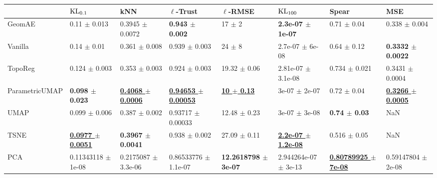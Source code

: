 \begin{tabular}{llllllll}
\toprule
{} &                               $\operatorname{KL}_{0.1}$ &                                        kNN &                                 $\ell$-Trust &                          $\ell$-RMSE &                                 $\operatorname{KL}_{100}$ &                                         Spear &                                        MSE \\
\midrule
GeomAE         &                           0.11 $\pm$ 0.013 &                        0.3945 $\pm$ 0.0072 &                   \textbf{0.943 $\pm$ 0.002} &                           17 $\pm$ 2 &                 \textbf{2.3e-07 $\pm$ 1e-07} &                               0.71 $\pm$ 0.04 &                          0.338 $\pm$ 0.004 \\
Vanilla        &                            0.14 $\pm$ 0.01 &                          0.361 $\pm$ 0.008 &                            0.939 $\pm$ 0.003 &                           24 $\pm$ 8 &                          2.7e-07 $\pm$ 6e-08 &                               0.64 $\pm$ 0.12 &               \textbf{0.3332 $\pm$ 0.0022} \\
TopoReg        &                          0.124 $\pm$ 0.003 &                          0.353 $\pm$ 0.003 &                            0.924 $\pm$ 0.003 &                     19.32 $\pm$ 0.06 &                       2.81e-07 $\pm$ 3.1e-08 &                             0.734 $\pm$ 0.021 &                        0.3431 $\pm$ 0.0004 \\
ParametricUMAP &                 \textbf{0.098 $\pm$ 0.023} &   \underline{\textbf{0.4068 $\pm$ 0.0006}} &   \underline{\textbf{0.94653 $\pm$ 0.00053}} &   \underline{\textbf{10 $\pm$ 0.13}} &                            3e-07 $\pm$ 2e-07 &                               0.72 $\pm$ 0.04 &   \underline{\textbf{0.3266 $\pm$ 0.0005}} \\
UMAP           &                          0.099 $\pm$ 0.006 &                          0.387 $\pm$ 0.002 &                        0.93717 $\pm$ 0.00033 &                     12.48 $\pm$ 0.23 &                            3e-07 $\pm$ 3e-08 &                      \textbf{0.74 $\pm$ 0.03} &                                        NaN \\
TSNE           &   \underline{\textbf{0.0977 $\pm$ 0.0051}} &               \textbf{0.3967 $\pm$ 0.0041} &                            0.938 $\pm$ 0.002 &                     27.09 $\pm$ 0.11 &   \underline{\textbf{2.2e-07 $\pm$ 1.2e-08}} &                              0.516 $\pm$ 0.05 &                                        NaN \\
PCA            &                     0.11343118 $\pm$ 1e-08 &                    0.2175087 $\pm$ 3.3e-06 &                     0.86533776 $\pm$ 1.1e-07 &      \textbf{12.2618798 $\pm$ 3e-07} &                     2.944264e-07 $\pm$ 3e-13 &   \underline{\textbf{0.80789925 $\pm$ 7e-08}} &                     0.59147804 $\pm$ 2e-08 \\
\bottomrule
\end{tabular}
